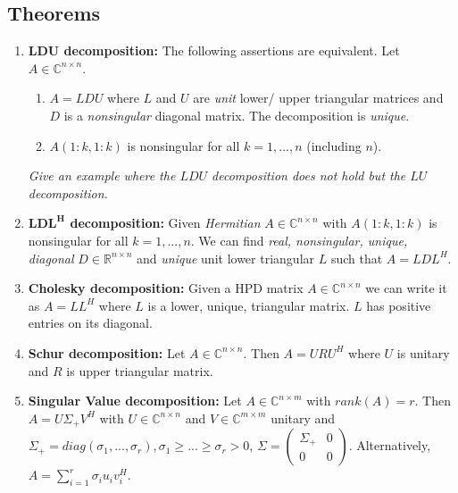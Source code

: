 \documentclass[a4paper, landscape,twocolumn,fontsize=9pt]{scrartcl}
\begin{document}
\subsection*{Theorems}
\begin{enumerate}
    \item \textbf{LDU decomposition:} The following assertions are equivalent. Let $A \in \mathbb C^{n \times n}$.
    \begin{enumerate}
        \item $A = LDU$ where $L$ and $U$ are \emph{unit} lower/ upper triangular matrices and $D$ is a \emph{nonsingular} diagonal matrix. The decomposition is \emph{unique}.
        
        \item $A(1:k, 1:k)$ is nonsingular for all $k = 1,...,n$ (including $n$).
    \end{enumerate}
    \textit{Give an example where the $LDU$ decomposition does not hold but the $LU$ decomposition.}
    \item \textbf{$\mathbf{LDL^H}$ decomposition:} Given \emph{Hermitian} $A \in \mathbb C^{n \times n}$ with $A(1:k,1:k)$ is nonsingular for all $k = 1,...,n$. We can find \emph{real, nonsingular, unique, diagonal} $D \in \mathbb R^{n \times n}$ and \emph{unique} unit lower triangular $L$ such that $A = LDL^H$.
    \item \textbf{Cholesky decomposition:} Given a HPD matrix $A \in \mathbb C^{n \times n}$ we can write it as $A = LL^H$ where $L$ is a lower, unique, triangular matrix. $L$ has positive entries on its diagonal.
    \item \textbf{Schur decomposition:} Let $A \in \mathbb C^{n \times n}$. Then $A = URU^H$ where $U$ is unitary and $R$ is upper triangular matrix.
	\item \textbf{Singular Value decomposition:} Let $A \in \mathbb C^{n \times m}$ with $rank(A) = r$. Then $A = U\Sigma_+ V^H$ with $U \in \mathbb C^{n \times n}$ and $V \in \mathbb C^{m \times m}$ unitary and $\Sigma_+ = diag(\sigma_1,...,\sigma_r), \sigma_1 \geq ... \geq \sigma_r > 0$, $\Sigma = \begin{pmatrix}
			\Sigma_+ & 0 \\ 0 & 0
	\end{pmatrix}$. Alternatively, $A = \sum^r_{i = 1} \sigma_i u_i  v_i^H$.
\end{enumerate}
\end{document}
